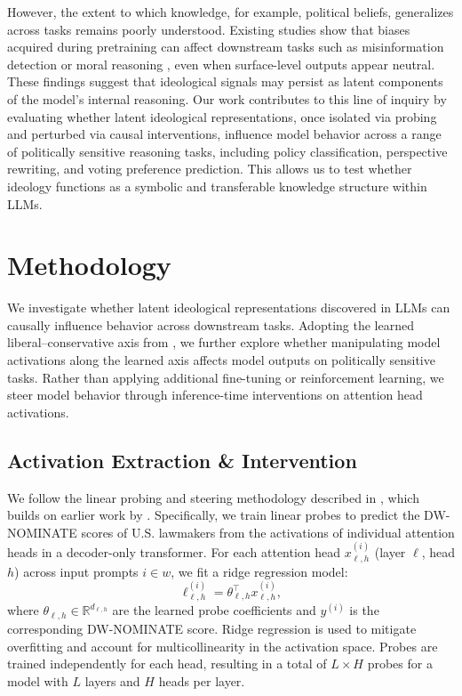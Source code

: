 \documentclass[11pt]{article}
\begin{document}
However, the extent to which knowledge, for example, political beliefs, generalizes across tasks remains poorly understood. Existing studies show that biases acquired during pretraining can affect downstream tasks such as misinformation detection or moral reasoning \citep{fengPretrainingDataLanguage2023, guptaBiasRunsDeep2023}, even when surface-level outputs appear neutral. These findings suggest that ideological signals may persist as latent components of the model's internal reasoning. Our work contributes to this line of inquiry by evaluating whether latent ideological representations, once isolated via probing and perturbed via causal interventions, influence model behavior across a range of politically sensitive reasoning tasks, including policy classification, perspective rewriting, and voting preference prediction. This allows us to test whether ideology functions as a symbolic and transferable knowledge structure within LLMs.

\section{Methodology}

We investigate whether latent ideological representations discovered in LLMs can causally influence behavior across downstream tasks. Adopting the learned liberal--conservative axis from \citet{kimLinearRepresentationsPolitical2025}, we further explore whether manipulating model activations along the learned axis affects model outputs on politically sensitive tasks. Rather than applying additional fine-tuning or reinforcement learning, we steer model behavior through inference-time interventions on attention head activations.

\subsection{Activation Extraction \& Intervention}

We follow the linear probing and steering methodology described in \citet{kimLinearRepresentationsPolitical2025}, which builds on earlier work by \citet{liInferenceTimeInterventionEliciting2023}. Specifically, we train linear probes to predict the DW-NOMINATE scores of U.S. lawmakers from the activations of individual attention heads in a decoder-only transformer. For each attention head \(x_{\ell,h}^{(i)}\) (layer \(\ell\), head \(h\)) across input prompts \(i \in w\), we fit a ridge regression model:
\[
\ell^{(i)}_{\ell,h} = \theta_{\ell,h}^\top x_{\ell,h}^{(i)},
\]
where \(\theta_{\ell,h} \in \mathbb{R}^{d_{\ell,h}}\) are the learned probe coefficients and \(y^{(i)}\) is the corresponding DW-NOMINATE score. Ridge regression is used to mitigate overfitting and account for multicollinearity in the activation space. Probes are trained independently for each head, resulting in a total of \(L \times H\) probes for a model with \(L\) layers and \(H\) heads per layer.
\end{document}
